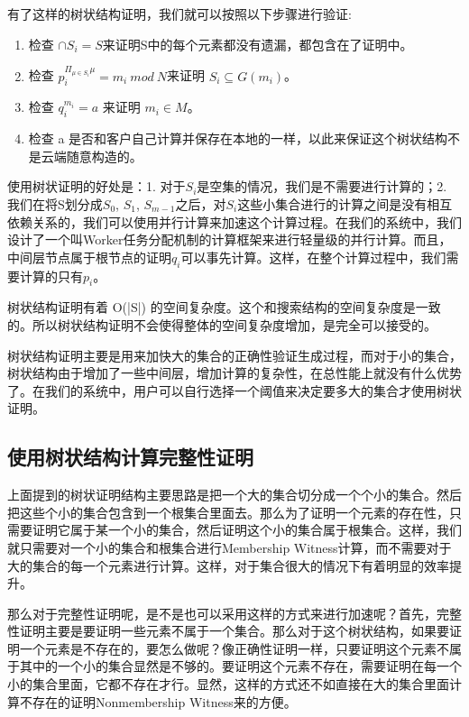有了这样的树状结构证明，我们就可以按照以下步骤进行验证:
\begin{enumerate}
  \item 检查 $\cap S_i = S$来证明S中的每个元素都没有遗漏，都包含在了证明中。
  \item 检查 $p_i^{\Pi_{\mu \in S_i} \mu} = m_i\ mod\ N$来证明 $S_i \subseteq G(m_i)$。
  \item 检查 $q_i^{m_i} = a$ 来证明 $m_i \in M$。
  \item 检查 a 是否和客户自己计算并保存在本地的一样，以此来保证这个树状结构不是云端随意构造的。
\end{enumerate}

使用树状证明的好处是：1. 对于$S_i$是空集的情况，我们是不需要进行计算的；2. 我们在将S划分成$S_0$, $S_1$, $S_{m-1}$之后，对$S_i$这些小集合进行的计算之间是没有相互依赖关系的，我们可以使用并行计算来加速这个计算过程。在我们的系统中，我们设计了一个叫Worker任务分配机制的计算框架来进行轻量级的并行计算。而且，中间层节点属于根节点的证明$q_i$可以事先计算。这样，在整个计算过程中，我们需要计算的只有$p_i$。

树状结构证明有着 O(|S|) 的空间复杂度。这个和搜索结构的空间复杂度是一致的。所以树状结构证明不会使得整体的空间复杂度增加，是完全可以接受的。

树状结构证明主要是用来加快大的集合的正确性验证生成过程，而对于小的集合，树状结构由于增加了一些中间层，增加计算的复杂性，在总性能上就没有什么优势了。在我们的系统中，用户可以自行选择一个阈值来决定要多大的集合才使用树状证明。

\subsection{使用树状结构计算完整性证明}
上面提到的树状证明结构主要思路是把一个大的集合切分成一个个小的集合。然后把这些个小的集合包含到一个根集合里面去。那么为了证明一个元素的存在性，只需要证明它属于某一个小的集合，然后证明这个小的集合属于根集合。这样，我们就只需要对一个小的集合和根集合进行Membership Witness计算，而不需要对于大的集合的每一个元素进行计算。这样，对于集合很大的情况下有着明显的效率提升。

那么对于完整性证明呢，是不是也可以采用这样的方式来进行加速呢？首先，完整性证明主要是要证明一些元素不属于一个集合。那么对于这个树状结构，如果要证明一个元素是不存在的，要怎么做呢？像正确性证明一样，只要证明这个元素不属于其中的一个小的集合显然是不够的。要证明这个元素不存在，需要证明在每一个小的集合里面，它都不存在才行。显然，这样的方式还不如直接在大的集合里面计算不存在的证明Nonmembership Witness来的方便。

